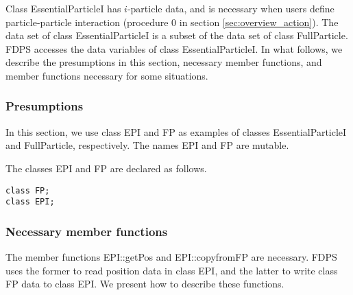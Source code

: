 Class EssentialParticleI has $i$-particle data, and is necessary when
users define particle-particle interaction (procedure 0 in section
\ref{sec:overview_action}). The data set of class EssentialParticleI
is a subset of the data set of class FullParticle. FDPS accesses the
data variables of class EssentialParticleI. In what follows, we
describe the presumptions in this section, necessary member functions,
and member functions necessary for some situations.

\subsubsection{Presumptions}

In this section, we use class EPI and FP as examples of classes
EssentialParticleI and FullParticle, respectively. The names EPI and
FP are mutable.

The classes EPI and FP are declared as follows.
\begin{screen}
\begin{verbatim}
class FP;
class EPI;
\end{verbatim}
\end{screen}

\subsubsection{Necessary member functions}


The member functions EPI::getPos and EPI::copyfromFP are
necessary. FDPS uses the former to read position data in class EPI,
and the latter to write class FP data to class EPI. We present how to
describe these functions.

